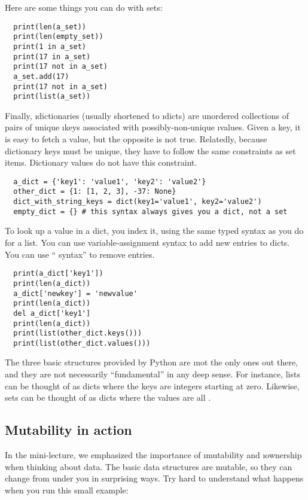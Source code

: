 \documentclass[letterpaper, 12pt, titlepage, twoside]{article}
\begin{document}
Here are some things you can do with sets:

\begin{lstlisting}
  print(len(a_set))
  print(len(empty_set))
  print(1 in a_set)
  print(17 in a_set)
  print(17 not in a_set)
  a_set.add(17)
  print(17 not in a_set)
  print(list(a_set))
\end{lstlisting}

Finally, \i{dictionaries} (usually shortened to \i{dicts}) are unordered
collections of pairs of unique \i{keys} associated with possibly-non-unique
\i{values}. Given a key, it is easy to fetch a value, but the opposite is not
true. Relatedly, because dictionary keys must be unique, they have to follow
the same constraints as set items. Dictionary values do not have this
constraint.

\begin{lstlisting}
  a_dict = {'key1': 'value1', 'key2': 'value2'}
  other_dict = {1: [1, 2, 3], -37: None}
  dict_with_string_keys = dict(key1='value1', key2='value2')
  empty_dict = {} # this syntax always gives you a dict, not a set
\end{lstlisting}

To look up a value in a dict, you index it, using the same typed syntax as you
do for a list. You can use variable-assignment syntax to add new entries to
dicts. You can use `` syntax'' to remove entries.

\begin{lstlisting}
  print(a_dict['key1'])
  print(len(a_dict))
  a_dict['newkey'] = 'newvalue'
  print(len(a_dict))
  del a_dict['key1']
  print(len(a_dict))
  print(list(other_dict.keys()))
  print(list(other_dict.values()))
\end{lstlisting}

The three basic structures provided by Python are \i{not} the only ones out
there, and they are not necessarily ``fundamental'' in any deep sense. For
instance, lists can be thought of as dicts where the keys are integers
starting at zero. Likewise, sets can be thought of as dicts where the values
are all .

\subsection*{Mutability in action}

In the mini-lecture, we emphasized the importance of \i{mutability} and
\i{ownership} when thinking about data. The basic data structures are mutable,
so they can change from under you in surprising ways. Try hard to understand
what happens when you run this small example:
\end{document}
